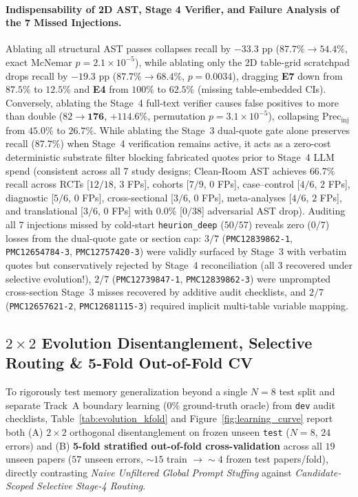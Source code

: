 \documentclass[11pt,a4paper]{article}
\begin{document}
\paragraph{Indispensability of 2D AST, Stage 4 Verifier, and Failure Analysis of the 7 Missed Injections.}
Ablating all structural AST passes collapses recall by $-33.3\text{ pp}$ ($87.7\% \to 54.4\%$, exact McNemar $p=2.1\times 10^{-5}$), while ablating only the 2D table-grid scratchpad drops recall by $-19.3\text{ pp}$ ($87.7\% \to 68.4\%$, $p=0.0034$), dragging \textbf{E7} down from $87.5\%$ to $12.5\%$ and \textbf{E4} from $100\%$ to $62.5\%$ (missing table-embedded CIs). Conversely, ablating the Stage~4 full-text verifier causes false positives to more than double ($82 \to \mathbf{176}$, $+114.6\%$, permutation $p=3.1\times 10^{-5}$), collapsing $\text{Prec}_{\text{inj}}$ from $45.0\%$ to $26.7\%$. While ablating the Stage~3 dual-quote gate alone preserves recall ($87.7\%$) when Stage~4 verification remains active, it acts as a zero-cost deterministic substrate filter blocking fabricated quotes prior to Stage~4 LLM spend (consistent across all 7 study designs; Clean-Room AST achieves $66.7\%$ recall across RCTs [$12/18$, $3$ FPs], cohorts [$7/9$, $0$ FPs], case--control [$4/6$, $2$ FPs], diagnostic [$5/6$, $0$ FPs], cross-sectional [$3/6$, $0$ FPs], meta-analyses [$4/6$, $2$ FPs], and translational [$3/6$, $0$ FPs] with $\mathbf{0.0\%}$ [$0/38$] adversarial AST drop). Auditing all $7$ injections missed by cold-start \texttt{heurion\_deep} ($50/57$) reveals zero ($0/7$) losses from the dual-quote gate or section cap: $3/7$ (\texttt{PMC12839862-1}, \texttt{PMC12654784-3}, \texttt{PMC12757420-3}) were validly surfaced by Stage~3 with verbatim quotes but conservatively rejected by Stage~4 reconciliation (all $3$ recovered under selective evolution!), $2/7$ (\texttt{PMC12739847-1}, \texttt{PMC12839862-3}) were unprompted cross-section Stage~3 misses recovered by additive audit checklists, and $2/7$ (\texttt{PMC12657621-2}, \texttt{PMC12681115-3}) required implicit multi-table variable mapping.

\subsection{\texorpdfstring{$2\times 2$}{2x2} Evolution Disentanglement, Selective Routing \& 5-Fold Out-of-Fold CV}
\label{sec:kfold_results}
To rigorously test memory generalization beyond a single $N=8$ test split and separate Track~A boundary learning ($0\%$ ground-truth oracle) from \texttt{dev} audit checklists, Table~\ref{tab:evolution_kfold} and Figure~\ref{fig:learning_curve} report both (A) $2\times 2$ orthogonal disentanglement on frozen unseen \texttt{test} ($N=8$, $24$ errors) and (B) \textbf{5-fold stratified out-of-fold cross-validation} across all $19$ unseen papers ($57$ unseen errors, $\sim 15$ train $\to \sim 4$ frozen test papers/fold), directly contrasting \emph{Naive Unfiltered Global Prompt Stuffing} against \emph{Candidate-Scoped Selective Stage-4 Routing}.
\end{document}
